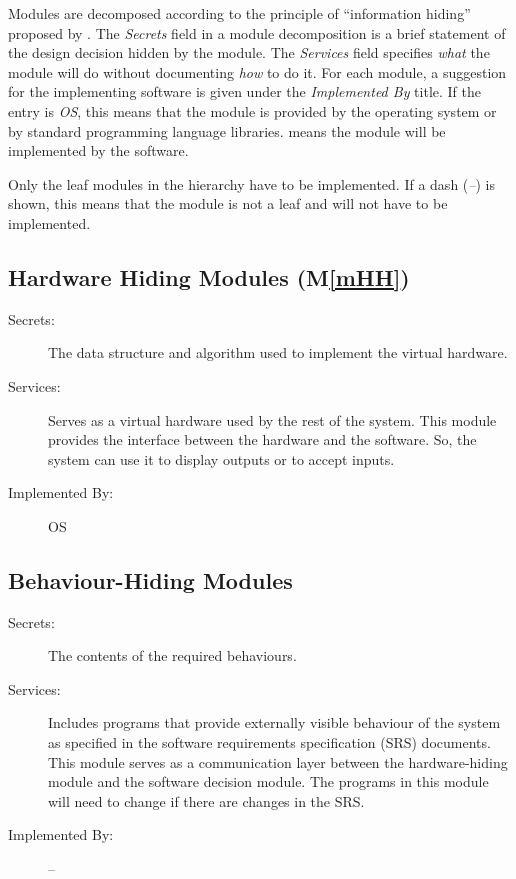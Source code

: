 \documentclass[12pt, titlepage]{article}
\newcommand{\mref}[1]{M\ref{#1}}
\begin{document}
Modules are decomposed according to the principle of ``information hiding''
proposed by \citet{ParnasEtAl1984}. The \emph{Secrets} field in a module
decomposition is a brief statement of the design decision hidden by the
module. The \emph{Services} field specifies \emph{what} the module will do
without documenting \emph{how} to do it. For each module, a suggestion for the
implementing software is given under the \emph{Implemented By} title. If the
entry is \emph{OS}, this means that the module is provided by the operating
system or by standard programming language libraries.  \emph{\progname{}} means the
module will be implemented by the \progname{} software.

Only the leaf modules in the hierarchy have to be implemented. If a dash
(\emph{--}) is shown, this means that the module is not a leaf and will not have
to be implemented.

\subsection{Hardware Hiding Modules (\mref{mHH})}

\begin{description}
\item[Secrets:]The data structure and algorithm used to implement the virtual
  hardware.
\item[Services:]Serves as a virtual hardware used by the rest of the
  system. This module provides the interface between the hardware and the
  software. So, the system can use it to display outputs or to accept inputs.
\item[Implemented By:] OS
\end{description}

\subsection{Behaviour-Hiding Modules}

\begin{description}
\item[Secrets:]The contents of the required behaviours.
\item[Services:]Includes programs that provide externally visible behaviour of
  the system as specified in the software requirements specification (SRS)
  documents. This module serves as a communication layer between the
  hardware-hiding module and the software decision module. The programs in this
  module will need to change if there are changes in the SRS.
\item[Implemented By:] --
\end{description}
\end{document}
